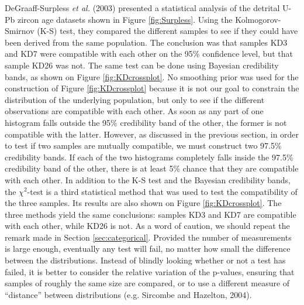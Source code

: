 \documentclass{article}
\begin{document}
DeGraaff-Surpless {\it et al.} (2003) presented a statistical analysis
of   the  detrital   U-Pb  zircon   age  datasets   shown   in  Figure
\ref{fig:Surpless}.   Using the  Kolmogorov-Smirnov  (K-S) test,  they
compared the different samples to  see if they could have been derived
from the same population.  The conclusion was that samples KD3 and KD7
were compatible with each other on the 95\% confidence level, but that
sample  KD26  was not.   The  same test  can  be  done using  Bayesian
credibility  bands,  as  shown  on Figure  \ref{fig:KDcrossplot}.   No
smoothing   prior   was   used   for  the   construction   of   Figure
\ref{fig:KDcrossplot}  because it  is not  our goal  to  constrain the
distribution  of the  underlying population,  but only  to see  if the
different observations are compatible with each other.  As soon as any
part of one  histogram falls outside the 95\%  credibility band of the
other,  the former  is not  compatible with  the latter.   However, as
discussed in the previous section, in order to test if two samples are
mutually compatible,  we must construct two  97.5\% credibility bands.
If  each of  the two  histograms  completely falls  inside the  97.5\%
credibility band of the other, there  is at least 5\% chance that they
are compatible with  each other.  In addition to the  K-S test and the
Bayesian credibility  bands, the $\chi^2$-test is  a third statistical
method that was  used to test the compatibility  of the three samples.
Its results are also shown on Figure \ref{fig:KDcrossplot}.  The three
methods yield the same conclusions: samples KD3 and KD7 are compatible
with each other,  while KD26 is not.  As a word  of caution, we should
repeat the remark made in Section \ref{sec:categorical}.  Provided the
number of measurements is large enough, eventually any test will fail,
no matter how small the difference between the distributions.  Instead
of blindly looking  whether or not a test has failed,  it is better to
consider the relative variation of the p-values, ensuring that samples
of roughly the  same size are compared, or to  use a different measure
of  ``distance'' between distributions  (e.g.  Sircombe  and Hazelton,
2004).\\
\end{document}
